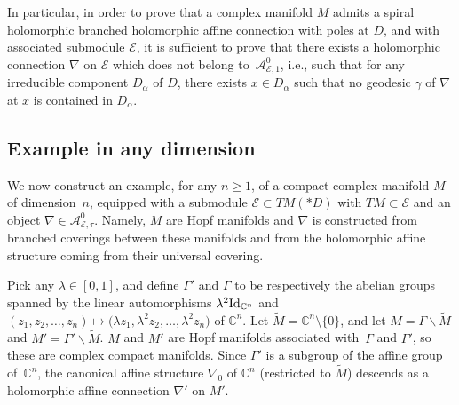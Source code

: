 \documentclass[pdftex]{sigma}
\numberwithin{equation}{section}
\begin{document}
In particular, in order to prove that a complex manifold $M$ admits a spiral holomorphic branched holomorphic affine connection with poles at $D$, and with associated submodule $\mathcal{E}$, it is sufficient to prove that there exists a holomorphic connection $\nabla$ on $\mathcal{E}$ which does not belong to~$\mathcal{A}^0_{\mathcal{E},1}$, i.e., such that for any irreducible component $D_\alpha$ of $D$, there exists $x\in D_\alpha$ such that no geodesic $\gamma$ of $\nabla$ at $x$ is contained in $D_\alpha$.

\subsection{Example in any dimension}
We now construct an example, for any $n\geq 1$, of a compact complex manifold $M$ of dimension~$n$, equipped with a submodule $\mathcal{E}\subset TM(* D)$ with $TM\subset \mathcal{E}$ and an object $\nabla \in \mathcal{A}^0_{\mathcal{E},\tau}$. Namely, $M$ are Hopf manifolds and $\nabla$ is constructed from branched coverings between these manifolds and from the holomorphic affine structure coming from their universal covering.

Pick any $\lambda \in [0,1]$, and define $\Gamma'$ and $\Gamma$ to be respectively the abelian groups spanned by the linear automorphisms $\lambda^2 {\rm Id}_{\mathbb{C}^n}$ and $(z_1,z_2,\dots,z_n)\mapsto \big(\lambda z_1, \lambda^2 z_2,\dots,\lambda^2 z_n\big)$ of $\mathbb{C}^n$. Let $\tilde{M}=\mathbb{C}^n \setminus \{0\}$, and let $M=\Gamma \backslash \tilde{M}$ and $M' = \Gamma' \backslash \tilde{M}$. $M$ and $M'$ are Hopf manifolds associated with~$\Gamma$ and $\Gamma'$, so these are complex compact manifolds. Since $\Gamma'$ is a subgroup of the affine group of~$\mathbb{C}^n$, the canonical affine structure $\nabla_0$ of $\mathbb{C}^n$ \big(restricted to $\tilde{M}$\big) descends as a holomorphic affine connection $\nabla'$ on $M'$.
\end{document}
